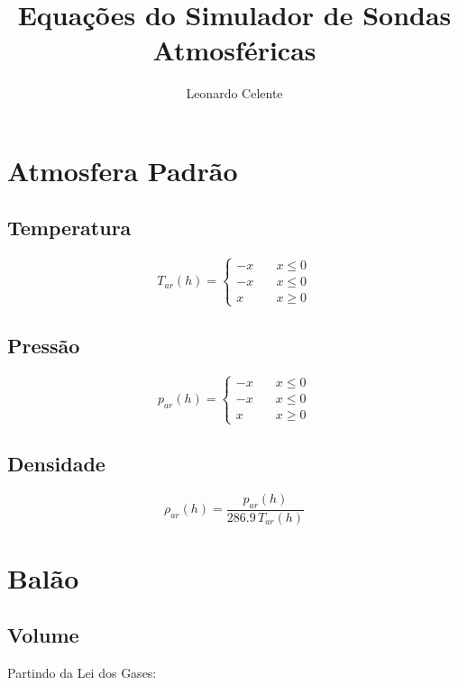 \documentclass[a4paper, 12pt]{article}
\title{Equações do Simulador de Sondas Atmosféricas}
\author{Leonardo Celente}
\begin{document}
\maketitle
\tableofcontents
\pagebreak
\section{Atmosfera Padrão}
\subsection {Temperatura}

\begin{equation}
  T_{ar}(h)  = \left\{
  \begin{array}{ll}
    -x & \quad x \leq 0 \\
    -x & \quad x \leq 0 \\
    x  & \quad x \geq 0
  \end{array}
  \right.
\end{equation}


\subsection {Pressão}

\begin{equation}
  p_{ar}(h)  = \left\{
  \begin{array}{ll}
    -x & \quad x \leq 0 \\
    -x & \quad x \leq 0 \\
    x  & \quad x \geq 0
  \end{array}
  \right.
\end{equation}


\subsection {Densidade}
\begin{equation}
  \rho_{ar}(h) = \frac{p_{ar}(h)}{286.9 \, T_{ar}(h)}
\end{equation}

\section {Balão}
\subsection {Volume}

Partindo da Lei dos Gases:
\end{document}
